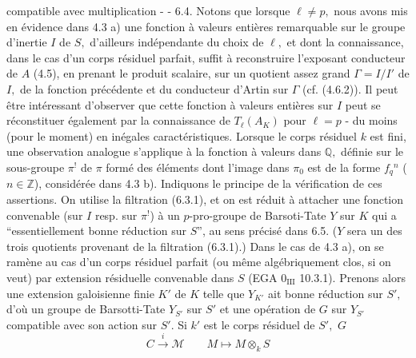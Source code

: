 compatible avec multiplication
-  -
6.4. Notons que lorsque \(\ell\neq p,\) nous avons mis en évidence dans 4.3 a) une fonction à valeurs entières remarquable sur le groupe d'inertie \(I\) de \(S,\) d'ailleurs indépendante du choix de \(\ell,\) et dont la connaissance, dans le cas d'un corps résiduel parfait, suffit à reconstruire l'exposant conducteur de \(A\) (4.5), en prenant le produit scalaire, sur un quotient assez grand \(\Gamma=I/I'\) de \(I,\) de la fonction précédente et du conducteur d'Artin sur \(\Gamma\) (cf. (4.6.2)). Il peut être intéressant d'observer que cette fonction à valeurs entières sur \(I\) peut se réconstituer également par la connaissance de \(T_\ell(A_K)\) pour \(\ell=p\) - du moins (pour le moment) en inégales caractéristiques. Lorsque le corps résiduel \(k\) est fini, une observation analogue s'applique à la fonction à valeurs dans \(\mathbb Q,\) définie sur le sous-groupe \(\pi^!\) de \(\pi\) formé des éléments dont l'image dans \(\pi_0\) est de la forme \(f_q{}^n\) (\(n\in\mathbb Z\)), considérée dans 4.3 b). Indiquons le principe de la vérification de ces assertions. On utilise la filtration (6.3.1), et on est réduit à attacher une fonction convenable (sur \(I\) resp. sur \(\pi^!\)) à un \(p\)-pro-groupe de Barsoti-Tate \(Y\) sur \(K\) qui a ``essentiellement bonne réduction sur \(S\)'', au sens précisé dans 6.5. (\(Y\) sera un des trois quotients provenant de la filtration (6.3.1).) Dans le cas de 4.3 a), on se ramène au cas d'un corps résiduel parfait (ou même algébriquement clos, si on veut) par extension résiduelle convenable dans \(S\) (EGA 0\(_{\mathrm{III}}\) 10.3.1). Prenons alors une extension galoisienne finie \(K'\) de \(K\) telle que \(Y_{K'}\) ait bonne réduction sur \(S',\) d'où un groupe de Barsotti-Tate \(Y_{S'}\) sur \(S'\) et une opération de \(G\) sur \(Y_{S'}\) compatible avec son action sur \(S'.\) Si \(k'\) est le corps résiduel de \(S',\) \(G\)
\[
C\xrightarrow{i}\mathcal M\qquad M\longmapsto M\otimes_k S
\]

